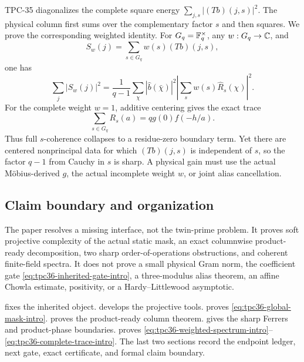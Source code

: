 TPC-35 diagonalizes the complete square energy
\(\sum_{j,s}|(Tb)(j,s)|^2\).  The physical column first sums over the
complementary factor \(s\) and then squares.  We prove the corresponding
weighted identity.  For \(G_q=\mathbb F_q^\times\), any \(w:G_q\to\mathbb C\), and
\begin{equation}
 S_w(j)=\sum_{s\in G_q}w(s)(Tb)(j,s),
 \label{eq:tpc36-weighted-trace-intro}
\end{equation}
one has
\begin{equation}
 \boxed{
 \sum_j|S_w(j)|^2
 =\frac1{q-1}\sum_\chi
 |\widehat b(\bar\chi)|^2
 \left|\sum_sw(s)\widehat R_s(\chi)\right|^2.}
 \label{eq:tpc36-weighted-spectrum-intro}
\end{equation}
For the complete weight \(w=1\), additive centering gives the exact trace
\begin{equation}
 \sum_{s\in G_q}R_s(a)=qg(0)f(-h/a).
 \label{eq:tpc36-complete-trace-intro}
\end{equation}
Thus full \(s\)-coherence collapses to a residue-zero boundary term.  Yet
there are centered nonprincipal data for which \((Tb)(j,s)\) is independent
of \(s\), so the factor \(q-1\) from Cauchy in \(s\) is sharp.  A physical
gain must use the actual M\"obius-derived \(g\), the actual incomplete
weight \(w\), or joint alias cancellation.

\subsection{Claim boundary and organization}

The paper resolves a missing interface, not the twin-prime problem.  It
proves soft projective complexity of the actual static mask, an exact
columnwise product-ready decomposition, two sharp order-of-operations
obstructions, and coherent finite-field spectra.  It does not prove a
small physical Gram norm, the coefficient gate
\eqref{eq:tpc36-inherited-gate-intro}, a three-modulus alias theorem, an
affine Chowla estimate, positivity, or a Hardy--Littlewood asymptotic.

 fixes the inherited object.
 develops the projective tools.
 proves \eqref{eq:tpc36-global-mask-intro}.
 proves the product-ready column theorem.
 gives the sharp Ferrers and product-phase
boundaries.   proves
\eqref{eq:tpc36-weighted-spectrum-intro}--
\eqref{eq:tpc36-complete-trace-intro}.  The last two sections record the
endpoint ledger, next gate, exact certificate, and formal claim boundary.
